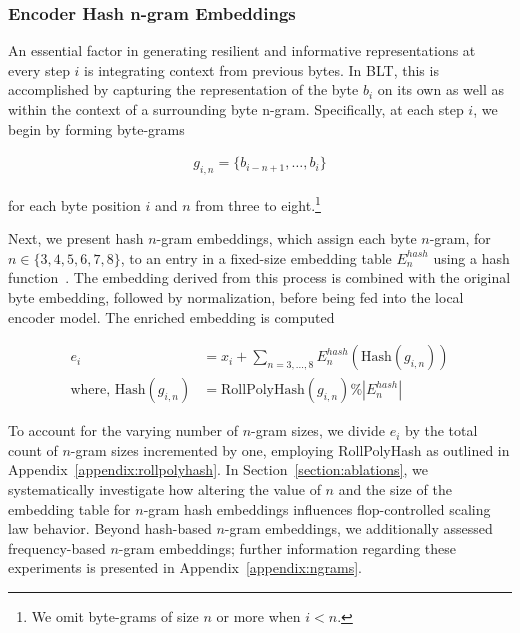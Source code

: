 \subsubsection{Encoder Hash n-gram Embeddings}
\label{sec:ngram-emb}
\label{sec:hash-emb}
An essential factor in generating resilient and informative representations at every step $i$ is integrating context from previous bytes. In {\textsc BLT}, this is accomplished by capturing the representation of the byte $b_i$ on its own as well as within the context of a surrounding byte n-gram. Specifically, at each step $i$, we begin by forming byte-grams

\begin{align}
    g_{i,n}=\{b_{i-n + 1},\ldots, b_i\}
\end{align}

for each byte position $i$ and $n$ from three to eight.\footnote{
We omit byte-grams of size $n$ or more when $i<n$. }

Next, we present hash $n$-gram embeddings, which assign each byte $n$-gram, for $n \in\{3,4,5,6,7,8\}$, to an entry in a fixed-size embedding table $E_{n}^{hash}$ using a hash function~\citep{bai2010learning}. The embedding derived from this process is combined with the original byte embedding, followed by normalization, before being fed into the local encoder model. The enriched embedding is computed

\begin{align}
e_i &= x_i + \sum_{n = 3,...,8}E_{n}^{hash}(\text{Hash}(g_{i,n})) \\
\text{where, Hash}(g_{i,n}) &= \text{RollPolyHash}(g_{i,n}) \% |E_{n}^{hash}|
\end{align}

To account for the varying number of $n$-gram sizes, we divide $e_i$ by the total count of $n$-gram sizes incremented by one, employing RollPolyHash as outlined in Appendix~\ref{appendix:rollpolyhash}. In Section~\ref{section:ablations}, we systematically investigate how altering the value of $n$ and the size of the embedding table for $n$-gram hash embeddings influences flop-controlled scaling law behavior. Beyond hash-based $n$-gram embeddings, we additionally assessed frequency-based $n$-gram embeddings; further information regarding these experiments is presented in Appendix~\ref{appendix:ngrams}.

